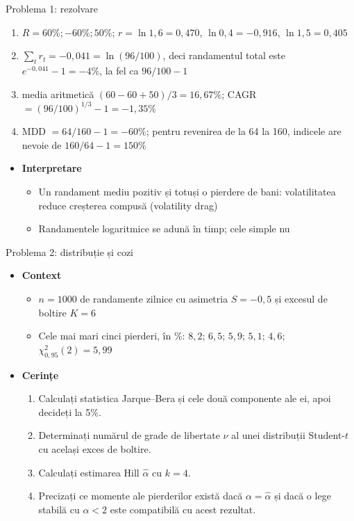 \begin{frame}{Problema 1: rezolvare}
\itemsize{\footnotesize}
\begin{enumerate}
    \item $R = 60\%; -60\%; 50\%$; $r = \ln 1{,}6 = 0{,}470$, $\ln 0{,}4 = -0{,}916$, $\ln 1{,}5 = 0{,}405$
    \item $\sum_t r_t = -0{,}041 = \ln(96/100)$, deci randamentul total este $e^{-0{,}041} - 1 = -4\%$, la fel ca $96/100 - 1$
    \item media aritmetică $(60 - 60 + 50)/3 = 16{,}67\%$; CAGR $= (96/100)^{1/3} - 1 = -1{,}35\%$
    \item MDD $= 64/160 - 1 = -60\%$; pentru revenirea de la 64 la 160, indicele are nevoie de $160/64 - 1 = 150\%$
\end{enumerate}
\begin{itemize}
    \item \textbf{Interpretare}
    \begin{itemize}
        \item Un randament mediu pozitiv și totuși o pierdere de bani: volatilitatea reduce creșterea compusă (volatility drag)
        \item Randamentele logaritmice se adună în timp; cele simple nu
    \end{itemize}
\end{itemize}
\end{frame}

\begin{frame}{Problema 2: distribuție și cozi}
\itemsize{\footnotesize}
\begin{itemize}
    \item \textbf{Context}
    \begin{itemize}
        \item $n = 1000$ de randamente zilnice cu asimetria $S = -0{,}5$ și excesul de boltire $K = 6$
        \item Cele mai mari cinci pierderi, în \%: $8{,}2$; $6{,}5$; $5{,}9$; $5{,}1$; $4{,}6$; $\chi^2_{0,95}(2) = 5{,}99$
    \end{itemize}
    \item \textbf{Cerințe}
\begin{enumerate}
    \item Calculați statistica Jarque--Bera și cele două componente ale ei, apoi decideți la 5\%.
    \item Determinați numărul de grade de libertate $\nu$ al unei distribuții Student-$t$ cu același exces de boltire.
    \item Calculați estimarea Hill $\hat\alpha$ cu $k = 4$.
    \item Precizați ce momente ale pierderilor există dacă $\alpha = \hat\alpha$ și dacă o lege stabilă cu $\alpha < 2$ este compatibilă cu acest rezultat.
\end{enumerate}
\end{itemize}
\end{frame}

